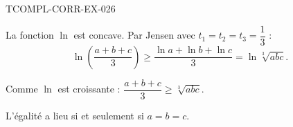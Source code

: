 \begin{corrige}{TCOMPL-CORR-EX-026}

La fonction $\ln$ est concave. Par Jensen avec $t_1=t_2=t_3=\dfrac{1}{3}$ :
\[ \ln\!\left(\frac{a+b+c}{3}\right) \geq \frac{\ln a + \ln b + \ln c}{3} = \ln\sqrt[3]{abc}. \]


Comme $\ln$ est croissante : $\dfrac{a+b+c}{3} \geq \sqrt[3]{abc}$.

L'égalité a lieu si et seulement si $a = b = c$.

\end{corrige}
